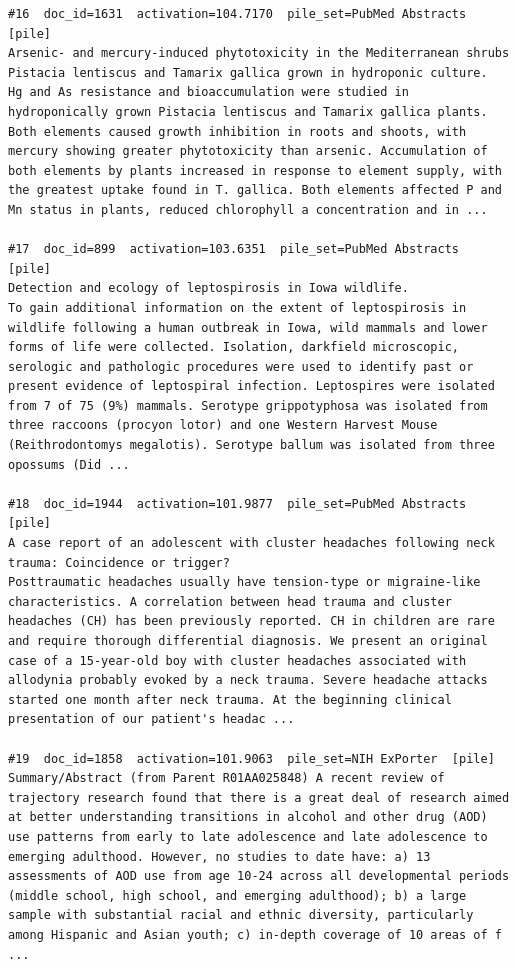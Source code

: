 \begin{verbatim}
#16  doc_id=1631  activation=104.7170  pile_set=PubMed Abstracts  [pile]
Arsenic- and mercury-induced phytotoxicity in the Mediterranean shrubs Pistacia lentiscus and Tamarix gallica grown in hydroponic culture.
Hg and As resistance and bioaccumulation were studied in hydroponically grown Pistacia lentiscus and Tamarix gallica plants. Both elements caused growth inhibition in roots and shoots, with mercury showing greater phytotoxicity than arsenic. Accumulation of both elements by plants increased in response to element supply, with the greatest uptake found in T. gallica. Both elements affected P and Mn status in plants, reduced chlorophyll a concentration and in ...

#17  doc_id=899  activation=103.6351  pile_set=PubMed Abstracts  [pile]
Detection and ecology of leptospirosis in Iowa wildlife.
To gain additional information on the extent of leptospirosis in wildlife following a human outbreak in Iowa, wild mammals and lower forms of life were collected. Isolation, darkfield microscopic, serologic and pathologic procedures were used to identify past or present evidence of leptospiral infection. Leptospires were isolated from 7 of 75 (9%) mammals. Serotype grippotyphosa was isolated from three raccoons (procyon lotor) and one Western Harvest Mouse (Reithrodontomys megalotis). Serotype ballum was isolated from three opossums (Did ...

#18  doc_id=1944  activation=101.9877  pile_set=PubMed Abstracts  [pile]
A case report of an adolescent with cluster headaches following neck trauma: Coincidence or trigger?
Posttraumatic headaches usually have tension-type or migraine-like characteristics. A correlation between head trauma and cluster headaches (CH) has been previously reported. CH in children are rare and require thorough differential diagnosis. We present an original case of a 15-year-old boy with cluster headaches associated with allodynia probably evoked by a neck trauma. Severe headache attacks started one month after neck trauma. At the beginning clinical presentation of our patient's headac ...

#19  doc_id=1858  activation=101.9063  pile_set=NIH ExPorter  [pile]
Summary/Abstract (from Parent R01AA025848) A recent review of trajectory research found that there is a great deal of research aimed at better understanding transitions in alcohol and other drug (AOD) use patterns from early to late adolescence and late adolescence to emerging adulthood. However, no studies to date have: a) 13 assessments of AOD use from age 10-24 across all developmental periods (middle school, high school, and emerging adulthood); b) a large sample with substantial racial and ethnic diversity, particularly among Hispanic and Asian youth; c) in-depth coverage of 10 areas of f ...


\end{verbatim}
